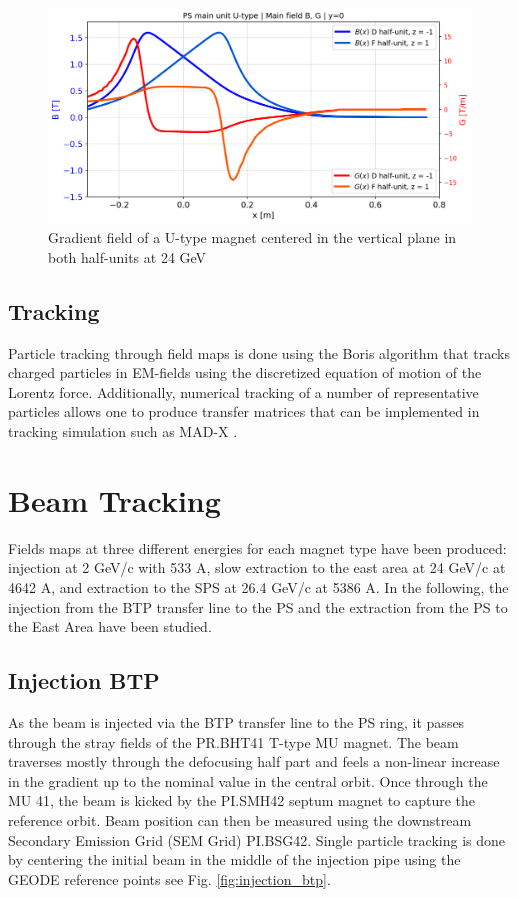 \documentclass[a4paper,
               biblatex,     %
               keeplastbox,   %
               ]{jacow}
\begin{document}
\begin{figure}[!htb]
   \centering
   \includegraphics*[width=1.0\columnwidth, trim={0 0 0 0cm},clip]{Main_field_B_G.png}
   \caption{Gradient field of a U-type magnet centered in the vertical plane in both half-units at 24 GeV}
   \label{fig:gradient_field}
\end{figure}

\subsection{Tracking}
Particle tracking through field maps is done using the Boris algorithm that tracks charged particles in EM-fields using the discretized equation of motion of the Lorentz force\cite{qin_why_2013}\cite{ripperda_comprehensive_2018}. Additionally, numerical tracking of a number of representative particles allows one to produce transfer matrices that can be implemented in tracking simulation such as MAD-X \cite{yoon_method_2013}.

\section{Beam Tracking}
Fields maps at three different energies for each magnet type have been produced: injection at 2 GeV/c with 533 A, slow extraction to the east area at 24 GeV/c at 4642 A, and extraction to the SPS at 26.4 GeV/c at 5386 A. In the following, the injection from the BTP transfer line to the PS and the extraction from the PS to the East Area have been studied.

\subsection{Injection BTP}
As the beam is injected via the BTP transfer line to the PS ring, it passes through the stray fields of the PR.BHT41 T-type MU magnet. The beam traverses mostly through the defocusing half part and feels a non-linear increase in the gradient up to the nominal value in the central orbit. Once through the MU 41, the beam is kicked by the PI.SMH42 septum magnet to capture the reference orbit. Beam position can then be measured using the downstream Secondary Emission Grid (SEM Grid) PI.BSG42. Single particle tracking is done by centering the initial beam in the middle of the injection pipe using the GEODE reference points see Fig. \ref{fig:injection_btp}.
\end{document}
